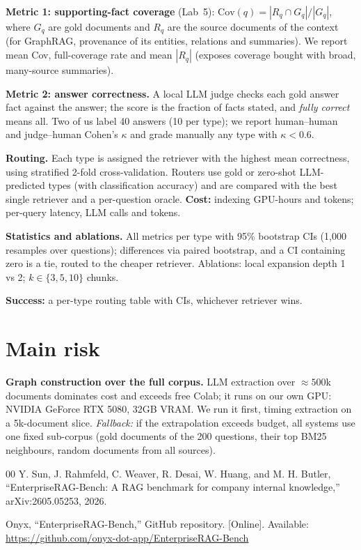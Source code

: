\documentclass[conference]{IEEEtran}
\begin{document}
\textbf{Metric 1: supporting-fact coverage} (Lab~5): $\mathrm{Cov}(q) = |R_q \cap G_q| / |G_q|$, where $G_q$ are gold documents and $R_q$ are the source documents of the context (for GraphRAG, provenance of its entities, relations and summaries). We report mean Cov, full-coverage rate and mean $|R_q|$ (exposes coverage bought with broad, many-source summaries).

\textbf{Metric 2: answer correctness.} A local LLM judge checks each gold answer fact against the answer; the score is the fraction of facts stated, and \emph{fully correct} means all. Two of us label 40 answers (10 per type); we report human--human and judge--human Cohen's $\kappa$ and grade manually any type with $\kappa < 0.6$.

\textbf{Routing.} Each type is assigned the retriever with the highest mean correctness, using stratified 2-fold cross-validation. Routers use gold or zero-shot LLM-predicted types (with classification accuracy) and are compared with the best single retriever and a per-question oracle. \textbf{Cost:} indexing GPU-hours and tokens; per-query latency, LLM calls and tokens.

\textbf{Statistics and ablations.} All metrics per type with 95\% bootstrap CIs (1{,}000 resamples over questions); differences via paired bootstrap, and a CI containing zero is a tie, routed to the cheaper retriever. Ablations: local expansion depth 1 vs 2; $k \in \{3,5,10\}$ chunks.

\textbf{Success:} a per-type routing table with CIs, whichever retriever wins.

\section{Main risk}
\textbf{Graph construction over the full corpus.} LLM extraction over ${\approx}500$k documents dominates cost and exceeds free Colab; it runs on our own GPU: NVIDIA GeForce RTX 5080, 32GB VRAM.
We run it first, timing extraction on a 5k-document slice. \emph{Fallback:} if the extrapolation exceeds budget, all systems use one fixed sub-corpus (gold documents of the 200 questions, their top BM25 neighbours, random documents from all sources).

\begin{thebibliography}{00}
 Y. Sun, J. Rahmfeld, C. Weaver, R. Desai, W. Huang, and M. H. Butler, ``EnterpriseRAG-Bench: A RAG benchmark for company internal knowledge,'' arXiv:2605.05253, 2026.

 Onyx, ``EnterpriseRAG-Bench,'' GitHub repository. [Online]. Available: \url{https://github.com/onyx-dot-app/EnterpriseRAG-Bench}

\end{thebibliography}
\end{document}
